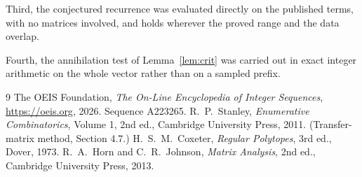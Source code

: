 \documentclass[11pt,a4paper]{article}
\theoremstyle{plain}
\theoremstyle{definition}
\begin{document}
Third, the conjectured recurrence was evaluated directly on the published terms, with no
matrices involved, and holds wherever the proved range and the data overlap.

Fourth, the annihilation test of Lemma~\ref{lem:crit} was carried out in exact integer
arithmetic on the whole vector rather than on a sampled prefix.

\begin{thebibliography}{9}
 The OEIS Foundation, \emph{The On-Line Encyclopedia of Integer
Sequences}, \url{https://oeis.org}, 2026. Sequence A223265.
 R.~P.~Stanley, \emph{Enumerative Combinatorics}, Volume 1, 2nd ed.,
Cambridge University Press, 2011. (Transfer-matrix method, Section 4.7.)
 H.~S.~M.~Coxeter, \emph{Regular Polytopes}, 3rd ed., Dover, 1973.
 R.~A.~Horn and C.~R.~Johnson, \emph{Matrix Analysis}, 2nd ed., Cambridge
University Press, 2013.
\end{thebibliography}
\end{document}
